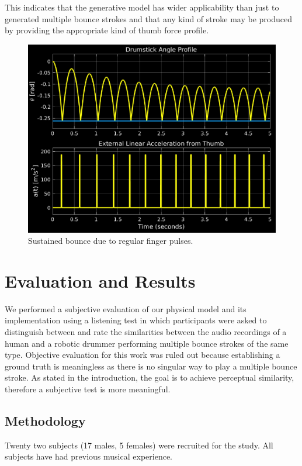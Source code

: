 \documentclass[final,1p,times]{elsarticle}
\begin{document}
This indicates that the generative model has wider applicability than just to generated multiple bounce strokes and that any kind of stroke may be produced by providing the appropriate kind of thumb force profile.
\begin{figure}[H]
	\begin{center}
		\includegraphics[scale =0.67]{./figures/Fig7.eps}
		\caption{Sustained bounce due to regular finger pulses.}
		\label{SB}
	\end{center}
\end{figure}
\section{Evaluation and Results}
We performed a subjective evaluation of our physical model and its implementation using a listening test in which participants were asked to distinguish between and rate the similarities between the audio recordings of a human and a robotic drummer performing multiple bounce strokes of the same type. Objective evaluation for this work was ruled out because establishing a ground truth is meaningless as there is no singular way to play a multiple bounce stroke. As stated in the introduction, the goal is to achieve perceptual similarity, therefore a subjective test is more meaningful. 

\subsection{Methodology}
Twenty two subjects (17 males, 5 females) were recruited for the study.
All subjects have had previous musical experience.
\end{document}
